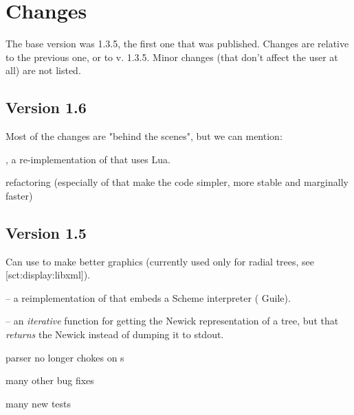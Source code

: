 \chapter{Changes}

The base version was 1.3.5, the first one that was published. Changes are
relative to the previous one, or to v. 1.3.5. Minor changes (that don't affect
the user at all) are not listed.

\section{Version 1.6}

Most of the changes are "behind the scenes", but we can mention:

\startitemize
\item \luaed, a re-implementation of \ed{} that uses Lua.
\item refactoring (especially of  that make the code
simpler, more stable and marginally faster)
\stopitemize

\section{Version 1.5}

\startitemize
\item Can use \libxml{} to make better graphics (currently used only for radial
trees, see \in{}[sct:display:libxml]).
\item \sched{}-- a reimplementation of \ed{} that embeds a Scheme interpreter
(\gnu{} Guile).
\item {} -- an {\em iterative} function for getting the
Newick representation of a tree, but that {\em returns} the Newick instead of dumping it to stdout.
\item parser no longer chokes on \code{/}s
\item many other bug fixes
\item many new tests
\stopitemize
